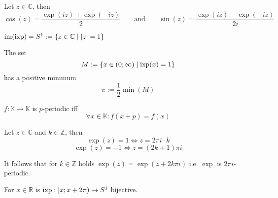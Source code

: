 \begin{proposition}
   Let \(z \in \mathbb{C}\), then
   \[\cos(z) = \frac{\exp(iz) + \exp(-iz)}{2} \qquad\text{and}\qquad \sin(z) = \frac{\exp(iz) - \exp(-iz)}{2i}\]
\end{proposition}

\begin{theorem}
   \(\operatorname{im}(\operatorname{ixp}) = S^1 := \{z \in \mathbb{C} \mid \lvert z\rvert = 1\}\)
\end{theorem}

\begin{center}
   
\end{center}

\begin{theorem}
   The set
   \[M := \{x \in (0; \infty) \mid \operatorname{ixp}(x) = 1\}\]
   has a positive minimum
   \[\pi := \frac{1}{2} \min(M)\]
\end{theorem}

\begin{definition}
   \(f: \mathbb{K} \to \mathbb{K}\) is \(p\)-periodic iff
   \[\forall x \in \mathbb{K}: f(x + p) = f(x)\]
\end{definition}

\begin{theorem}
   Let \(z \in \mathbb{C}\) and \(k \in \mathbb{Z}\), then
   \[\exp(z) = 1 \iff z = 2 \pi i \cdot k\]
   \[\exp(z) = -1 \iff z = (2k + 1)\pi i\]
\end{theorem}
\begin{remark}
   It follows that for \(k \in \mathbb{Z}\) holds \(\exp(z) = \exp(z + 2k\pi i)\) i.e. \(\exp\) is \(2\pi i\)-periodic.
\end{remark}

\begin{theorem}
   For \(x \in \mathbb{R}\) is \(\operatorname{ixp}: [x; x + 2\pi) \to S^1\) bijective.
\end{theorem}

